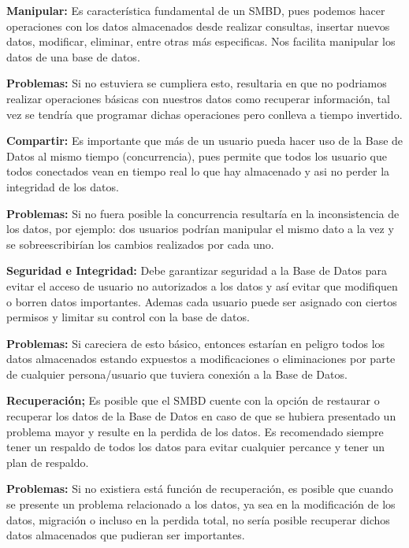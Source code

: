 \documentclass[12pt]{report}
\begin{document}
\begin{enumerate}[label=\textbf{\arabic*.}, leftmargin=*]
\begin{enumerate}[label=\textbf{\alph*.}, leftmargin=*, itemsep=1.0em]
    
\textbf{Manipular:}
Es característica fundamental de un SMBD, pues podemos hacer operaciones con los datos almacenados desde realizar consultas, insertar nuevos datos, modificar, eliminar, entre otras más especificas. Nos facilita manipular los datos de una base de datos. 

\hspace{0.3cm}\textbf{Problemas:} 
Si no estuviera se cumpliera esto, resultaria en que no podriamos realizar operaciones básicas con nuestros datos como recuperar información, tal vez se tendría que programar dichas operaciones pero conlleva a tiempo invertido.

    
\textbf{Compartir:}
Es importante que más de un usuario pueda hacer uso de la Base de Datos al mismo tiempo (concurrencia), pues permite que todos los usuario que todos conectados vean en tiempo real lo que hay almacenado y asi no perder la integridad de los datos.

\hspace{0.3cm}\textbf{Problemas:} 
Si no fuera posible la concurrencia resultaría en la inconsistencia de los datos, por ejemplo: dos usuarios podrían manipular el mismo dato a la vez y se sobreescribirían los cambios realizados por cada uno. 
    
\textbf{Seguridad e Integridad:}
Debe garantizar seguridad a la Base de Datos para evitar el acceso de usuario no autorizados a los datos y así evitar que modifiquen o borren datos importantes. Ademas cada usuario puede ser asignado con ciertos permisos y limitar su control con la base de datos.
 
\hspace{0.3cm}\textbf{Problemas:} 
Si careciera de esto básico, entonces estarían en peligro todos los datos almacenados estando expuestos a modificaciones o eliminaciones por parte de cualquier persona/usuario que tuviera conexión a la Base de Datos.

\textbf{Recuperación;}
Es posible que el SMBD cuente con la opción de restaurar o recuperar los datos de la Base de Datos en caso de que se hubiera presentado un problema mayor y resulte en la perdida de los datos. Es recomendado siempre tener un respaldo de todos los datos para evitar cualquier percance y tener un plan de respaldo.

\hspace{0.3cm}\textbf{Problemas:}
Si no existiera está función de recuperación, es posible que cuando se presente un problema relacionado a los datos, ya sea en la modificación de los datos, migración o incluso en la perdida total, no sería posible recuperar dichos datos almacenados que pudieran ser importantes.



\end{enumerate}
\end{enumerate}
\end{document}
